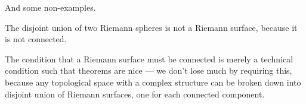 And some non-examples.
\begin{example}
	The disjoint union of two Riemann spheres is not a Riemann surface, because it is not connected.
\end{example}
The condition that a Riemann surface must be connected is merely a technical condition such that
theorems are nice --- we don't lose much by requiring this, because any topological space with a
complex structure can be broken down into disjoint union of Riemann surfaces, one for each connected
component.

